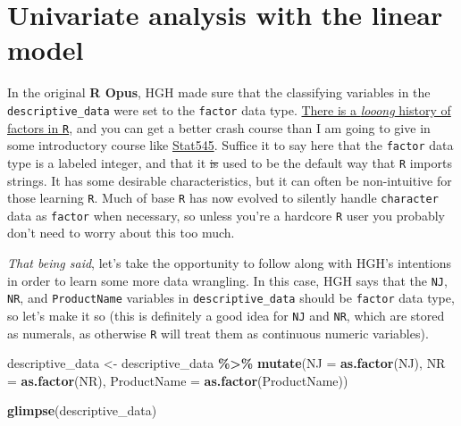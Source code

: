 \documentclass[
]{book}
\newenvironment{Shaded}{\begin{snugshade}}{\end{snugshade}}
\newcommand{\AttributeTok}[1]{\textcolor[rgb]{0.13,0.29,0.53}{#1}}
\newcommand{\FunctionTok}[1]{\textcolor[rgb]{0.13,0.29,0.53}{\textbf{#1}}}
\newcommand{\NormalTok}[1]{#1}
\newcommand{\OtherTok}[1]{\textcolor[rgb]{0.56,0.35,0.01}{#1}}
\newcommand{\SpecialCharTok}[1]{\textcolor[rgb]{0.81,0.36,0.00}{\textbf{#1}}}
\begin{document}
\section{Univariate analysis with the linear model}\label{univariate-analysis-with-the-linear-model}

In the original \textbf{R Opus}, HGH made sure that the classifying variables in the \texttt{descriptive\_data} were set to the \texttt{factor} data type. \href{https://notstatschat.tumblr.com/post/124987394001/stringsasfactors-sigh}{There is a \emph{looong} history of factors in \texttt{R}}, and you can get a better crash course than I am going to give in some introductory course like \href{https://stat545.com/factors-boss.html}{Stat545}. Suffice it to say here that the \texttt{factor} data type is a labeled integer, and that it \st{is} used to be the default way that \texttt{R} imports strings. It has some desirable characteristics, but it can often be non-intuitive for those learning \texttt{R}. Much of base \texttt{R} has now evolved to silently handle \texttt{character} data as \texttt{factor} when necessary, so unless you're a hardcore \texttt{R} user you probably don't need to worry about this too much.

\emph{That being said}, let's take the opportunity to follow along with HGH's intentions in order to learn some more data wrangling. In this case, HGH says that the \texttt{NJ}, \texttt{NR}, and \texttt{ProductName} variables in \texttt{descriptive\_data} should be \texttt{factor} data type, so let's make it so (this is definitely a good idea for \texttt{NJ} and \texttt{NR}, which are stored as numerals, as otherwise \texttt{R} will treat them as continuous numeric variables).

\begin{Shaded}
\begin{Highlighting}[]
\NormalTok{descriptive\_data }\OtherTok{\textless{}{-}} 
\NormalTok{  descriptive\_data }\SpecialCharTok{\%\textgreater{}\%}
  \FunctionTok{mutate}\NormalTok{(}\AttributeTok{NJ =} \FunctionTok{as.factor}\NormalTok{(NJ),}
         \AttributeTok{NR =} \FunctionTok{as.factor}\NormalTok{(NR),}
         \AttributeTok{ProductName =} \FunctionTok{as.factor}\NormalTok{(ProductName))}

\FunctionTok{glimpse}\NormalTok{(descriptive\_data)}
\end{Highlighting}
\end{Shaded}
\end{document}
